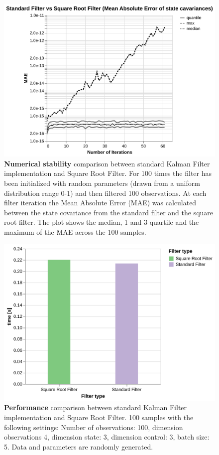 \documentclass{article}
\begin{document}
\begin{figure}
\includegraphics[width=\textwidth]{numerical_stability}
 \caption{\textbf{Numerical stability} comparison between standard Kalman Filter implementation and Square Root Filter. For 100 times the filter has been initialized with random parameters (drawn from a uniform distribution range 0-1) and then filtered 100 observations. At each filter iteration the Mean Absolute Error (MAE) was calculated between the state covariance from the standard filter and the square root filter. The plot shows the median, 1 and 3 quartile and the maximum of the MAE across the 100 samples.}
\end{figure}

\begin{figure}
\includegraphics[width=\textwidth]{perf_sr}
 \caption{\textbf{Performance} comparison between standard Kalman Filter implementation and Square Root Filter. 100 samples with the following settings: Number of observations: 100, dimension observations 4, dimension state: 3, dimension control: 3, batch size: 5. Data and parameters are randomly generated.}
\end{figure}
\end{document}
